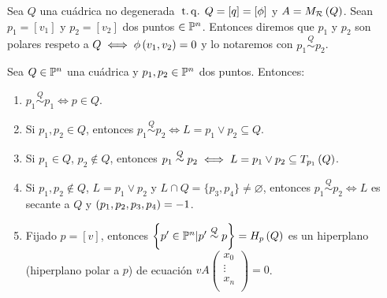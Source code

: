 \begin{defi}
  Sea $Q$ una cuádrica no degenerada $\operatorname{\;t.q.\;} Q=[q]=[\phi]$ y $A=M_{\mathcal{R}}\left( Q\right)$. Sean $p_1=[v_1]$ y 
  $p_2=[v_2]$ dos puntos $\in \mathbb{P}^n$. Entonces diremos que $p_1$ y $p_2$ son polares respeto a $Q\iff
  \phi\left( v_1,v_2\right)=0$ y lo notaremos con $p_1 \stackrel{Q}{\sim} p_2$. 
\end{defi}

\begin{prop}
  Sea $Q\in\mathbb{P}^n$ una cuádrica y $p_1, p_2\in\mathbb{P}^n$ dos puntos. Entonces:
  \begin{enumerate}[(1)]
   \item $p_1 \stackrel{Q}{\sim} p_1 \iff p\in Q$.
   \item Si $p_1,p_2\in Q$, entonces $p_1 \stackrel{Q}{\sim} p_2 \iff L=p_1\vee p_2 \subseteq Q$.
   \item Si $p_1\in Q$, $p_2 \not\in Q$, entonces $p_1 \stackrel{Q}{\sim} p_2 \iff L=p_1\vee p_2 
   \subseteq T_{p_1}\left( Q \right)$.
   \item Si $p_1,p_2\not\in Q$, $ L=p_1\vee p_2$ y $ L\cap Q =\{p_3,p_4\}\neq \varnothing$, entonces
   $p_1 \stackrel{Q}{\sim} p_2 \iff L$ es secante a $Q$ y $\left( p_1,p_2,p_3,p_4\right) =-1$. 
   \item Fijado $p=[v]$, entonces $\left\{p'\in\mathbb{P}^n | p' \stackrel{Q}{\sim} p\right\} = H_p\left( Q\right)$
   es un hiperplano (hiperplano polar a $p$) de ecuación $vA\begin{pmatrix}x_0\\ \vdots\\ x_n\\ \end{pmatrix}=0$.
  \end{enumerate}
\end{prop}
